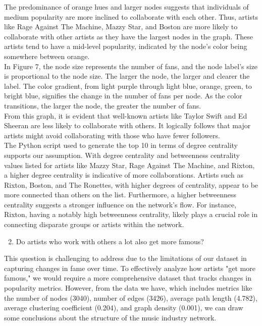 \documentclass[12pt,a4paper]{article}
\begin{document}
The predominance of orange hues and larger nodes suggests that individuals of medium popularity are more inclined to collaborate with each other. Thus, artists like Rage Against The Machine, Mazzy Star, and Boston are more likely to collaborate with other artists as they have the largest nodes in the graph. These artists tend to have a mid-level popularity, indicated by the node's color being somewhere between orange.\\

In Figure 7, the node size represents the number of fans, and the node label's size is proportional to the node size. The larger the node, the larger and clearer the label. The color gradient, from light purple through light blue, orange, green, to bright blue, signifies the change in the number of fans per node. As the color transitions, the larger the node, the greater the number of fans.\\

From this graph, it is evident that well-known artists like Taylor Swift and Ed Sheeran are less likely to collaborate with others. It logically follows that major artists might avoid collaborating with those who have fewer followers.\\

The Python script used to generate the top 10 in terms of degree centrality supports our assumption. With degree centrality and betweenness centrality values listed for artists like Mazzy Star, Rage Against The Machine, and Rixton, a higher degree centrality is indicative of more collaborations. Artists such as Rixton, Boston, and The Ronettes, with higher degrees of centrality, appear to be more connected than others on the list. Furthermore, a higher betweenness centrality suggests a stronger influence on the network's flow. For instance, Rixton, having a notably high betweenness centrality, likely plays a crucial role in connecting disparate groups or artists within the network.\\
\begin{enumerate}
  \setcounter{enumi}{1}
  \item Do artists who work with others a lot also get more famous?
\end{enumerate}
This question is challenging to address due to the limitations of our dataset in capturing changes in fame over time. To effectively analyze how artists "get more famous," we would require a more comprehensive dataset that tracks changes in popularity metrics. However, from the data we have, which includes metrics like the number of nodes (3040), number of edges (3426), average path length (4.782), average clustering coefficient (0.204), and graph density (0.001), we can draw some conclusions about the structure of the music industry network.\\
\end{document}
